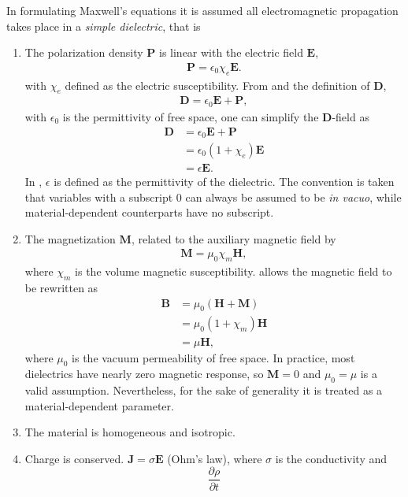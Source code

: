 In formulating Maxwell's equations it is assumed all electromagnetic
propagation takes place in a {\it simple dielectric}, that is
\begin{enumerate}
\item The polarization density $\mathbf{P}$ is linear with the electric
field $\mathbf{E}$,
\begin{align}
\mathbf{P}=\epsilon_0\chi_e\mathbf{E}.
\label{eqn:pdensity}
\end{align}
with $\chi_e$ defined as the electric susceptibility.  From
 and the definition
of $\mathbf{D}$,
\begin{align}
\mathbf{D}=\epsilon_0\mathbf{E}+\mathbf{P},
\label{eqn:dfield}
\end{align}
with $\epsilon_0$ is the permittivity of free space, one can simplify the
$\mathbf{D}$-field as
\begin{align}
\mathbf{D}&=\epsilon_0\mathbf{E}+\mathbf{P}\\
&=\epsilon_0(1+\chi_e)\mathbf{E}\\
&=\epsilon\mathbf{E}.
\label{eqn:permittivitydangle}
\end{align}
In , $\epsilon$ is defined as the
permittivity of the dielectric.  The convention is taken
that variables with a subscript $0$ can always be assumed to be
{\it in vacuo}, while material-dependent counterparts have
no subscript.
\item The magnetization $\mathbf{M}$, related to the
auxiliary magnetic field by
\begin{align}
\mathbf{M}=\mu_0\chi_m\mathbf{H},
\label{eqn:auxfield}
\end{align}
where $\chi_m$ is the volume magnetic susceptibility.
 allows the
magnetic field to be rewritten as
\begin{align}
\mathbf{B}&=\mu_0\left(\mathbf{H}+\mathbf{M}\right)\\
&=\mu_0\left(1+\chi_m\right)\mathbf{H}\\
&=\mu \mathbf{H},
\end{align}
where $\mu_0$ is the vacuum permeability of free space.  In practice, most
dielectrics have nearly zero magnetic response, so $\mathbf{M}=0$ and
$\mu_0=\mu$ is a valid assumption.  Nevertheless, for the sake of generality it is treated as a
material-dependent parameter.
\item The material is homogeneous and isotropic.
\item Charge is conserved.  $\mathbf{J} = \sigma \mathbf{E}$ (Ohm's law), where
 $\sigma$ is the conductivity and
\begin{equation}
 \frac{\partial \rho}{\partial t}
\end{equation}
\end{enumerate}
